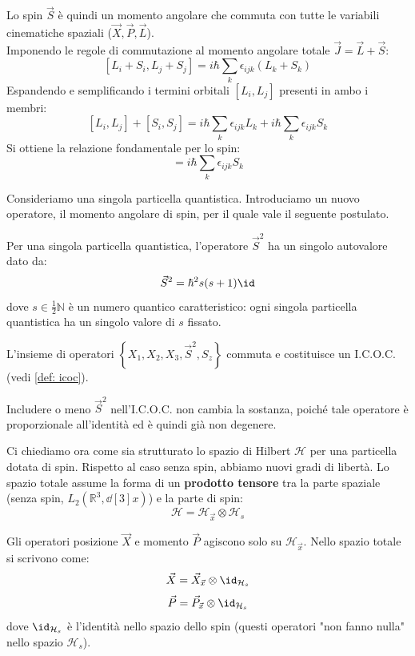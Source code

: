 Lo spin \(\vec{S}\) è quindi un momento angolare che commuta con tutte le variabili cinematiche spaziali (\(\vec{X}, \vec{P}, \vec{L}\)).\\
Imponendo le regole di commutazione al momento angolare totale \(\vec{J} = \vec{L} + \vec{S}\):
\[
[L_i + S_i, L_j + S_j] = i\hbar \sum_k \epsilon_{ijk} (L_k + S_k)
\]
Espandendo e semplificando i termini orbitali \([L_i, L_j]\) presenti in ambo i membri:
\[
[L_i, L_j] + [S_i, S_j] = i\hbar \sum_k \epsilon_{ijk} L_k + i\hbar \sum_k \epsilon_{ijk} S_k
\]
Si ottiene la relazione fondamentale per lo spin:
\begin{equation}
    [S_i, S_j] = i\hbar \sum_k \epsilon_{ijk} S_k
\end{equation}



Consideriamo una singola particella quantistica. Introduciamo un nuovo operatore, il momento angolare di spin, per il quale vale il seguente postulato.

\begin{postulato8}
    Per una singola particella quantistica, l'operatore \(\vec{S}^2\) ha un singolo autovalore dato da:
    \begin{equation}
        \vec{S}^2 = \hbar^2 s(s+1) \id
    \end{equation}
    dove \(s \in \frac{1}{2}\mathbb{N}\) è un numero quantico caratteristico: ogni singola particella quantistica ha un singolo valore di \(s\) fissato.
\end{postulato8}

L'insieme di operatori \(\left\{ X_1, X_2, X_3, \vec{S}^2, S_z \right\}\) commuta e costituisce un I.C.O.C. (vedi \ref{def: icoc}).
\begin{remark}
    Includere o meno \(\vec{S}^2\) nell'I.C.O.C. non cambia la sostanza, poiché tale operatore è proporzionale all'identità ed è quindi già non degenere.
\end{remark}


Ci chiediamo ora come sia strutturato lo spazio di Hilbert \(\mathcal{H}\) per una particella dotata di spin.
Rispetto al caso senza spin, abbiamo nuovi gradi di libertà. Lo spazio totale assume la forma di un \textbf{prodotto tensore} tra la parte spaziale (senza spin, \(L_2(\mathbb{R}^3, \dd[3]{x})\)) e la parte di spin:
\begin{equation}
    \mathcal{H} = \mathcal{H}_{\vec{x}} \otimes \mathcal{H}_s
\end{equation}

Gli operatori posizione \(\vec{X}\) e momento \(\vec{P}\) agiscono solo su \(\mathcal{H}_{\vec{x}}\). Nello spazio totale si scrivono come:
\[
    \vec{X} = \vec{X}_{\vec{x}} \otimes \id_{\mathcal{H}_s}
\]
\[
    \vec{P} = \vec{P}_{\vec{x}} \otimes \id_{\mathcal{H}_s}
\]
dove \(\id_{\mathcal{H}_s}\) è l'identità nello spazio dello spin (questi operatori "non fanno nulla" nello spazio \(\mathcal{H}_s\)).

